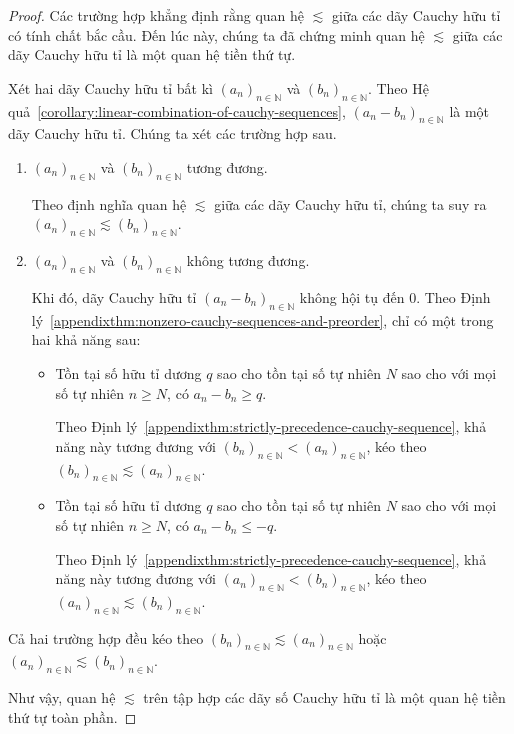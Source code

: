 \begin{proof}
    Các trường hợp khẳng định rằng quan hệ $\lesssim$ giữa các dãy Cauchy hữu tỉ có tính chất bắc cầu. Đến lúc này, chúng ta đã chứng minh quan hệ $\lesssim$ giữa các dãy Cauchy hữu tỉ là một quan hệ tiền thứ tự.

    Xét hai dãy Cauchy hữu tỉ bất kì ${(a_{n})}_{n\in\mathbb{N}}$ và ${(b_{n})}_{n\in\mathbb{N}}$. Theo Hệ quả~\ref{corollary:linear-combination-of-cauchy-sequences}, ${(a_{n} - b_{n})}_{n\in\mathbb{N}}$ là một dãy Cauchy hữu tỉ. Chúng ta xét các trường hợp sau.
    \begin{enumerate}[label={\textbf{Trường hợp \arabic*.}},itemindent=2cm]
        \item ${(a_{n})}_{n\in\mathbb{N}}$ và ${(b_{n})}_{n\in\mathbb{N}}$ tương đương.

              Theo định nghĩa quan hệ $\lesssim$ giữa các dãy Cauchy hữu tỉ, chúng ta suy ra ${(a_{n})}_{n\in\mathbb{N}}\lesssim {(b_{n})}_{n\in\mathbb{N}}$.
        \item ${(a_{n})}_{n\in\mathbb{N}}$ và ${(b_{n})}_{n\in\mathbb{N}}$ không tương đương.

              Khi đó, dãy Cauchy hữu tỉ ${(a_{n} - b_{n})}_{n\in\mathbb{N}}$ không hội tụ đến $0$. Theo Định lý~\ref{appendixthm:nonzero-cauchy-sequences-and-preorder}, chỉ có một trong hai khả năng sau:
              \begin{itemize}
                  \item Tồn tại số hữu tỉ dương $q$ sao cho tồn tại số tự nhiên $N$ sao cho với mọi số tự nhiên $n\geq N$, có $a_{n} - b_{n}\geq q$.

                        Theo Định lý~\ref{appendixthm:strictly-precedence-cauchy-sequence}, khả năng này tương đương với ${(b_{n})}_{n\in\mathbb{N}} < {(a_{n})}_{n\in\mathbb{N}}$, kéo theo ${(b_{n})}_{n\in\mathbb{N}}\lesssim {(a_{n})}_{n\in\mathbb{N}}$.
                  \item Tồn tại số hữu tỉ dương $q$ sao cho tồn tại số tự nhiên $N$ sao cho với mọi số tự nhiên $n\geq N$, có $a_{n} - b_{n}\leq -q$.

                        Theo Định lý~\ref{appendixthm:strictly-precedence-cauchy-sequence}, khả năng này tương đương với ${(a_{n})}_{n\in\mathbb{N}} < {(b_{n})}_{n\in\mathbb{N}}$, kéo theo ${(a_{n})}_{n\in\mathbb{N}}\lesssim {(b_{n})}_{n\in\mathbb{N}}$.
              \end{itemize}
    \end{enumerate}

    Cả hai trường hợp đều kéo theo ${(b_{n})}_{n\in\mathbb{N}}\lesssim {(a_{n})}_{n\in\mathbb{N}}$ hoặc ${(a_{n})}_{n\in\mathbb{N}}\lesssim {(b_{n})}_{n\in\mathbb{N}}$.

    Như vậy, quan hệ $\lesssim$ trên tập hợp các dãy số Cauchy hữu tỉ là một quan hệ tiền thứ tự toàn phần.
\end{proof}

